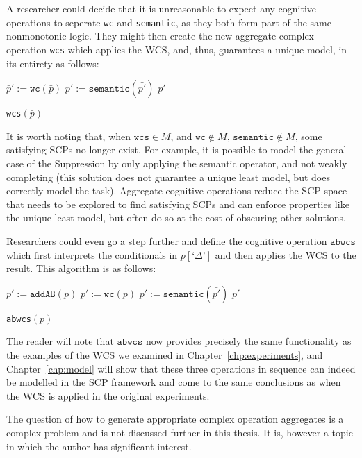 {A researcher could decide that it is unreasonable to expect any cognitive operations to seperate \texttt{wc} and \texttt{semantic}, as they both form part of the same nonmonotonic logic. They might then create the new aggregate complex operation \texttt{wcs} which applies the WCS, and, thus, guarantees a unique model, in its entirety as follows:

\begin{algorithm}[H] 
\SetAlgoLined
{}
{
$\bar{p}':=\texttt{wc}(\bar{p})$\;
$p':=\texttt{semantic}(\bar{p'})$\;
\Return $p'$
}

\caption{\texttt{wcs}$(\bar{p})$}
\label{cogOp:wcs}
\end{algorithm}

It is worth noting that, when $\texttt{wcs} \in M$, and $\texttt{wc} \not\in M$, $\texttt{semantic}\not\in M$, some satisfying SCPs no longer exist. For example, it is possible to model the general case of the Suppression by only applying the semantic operator, and not weakly completing (this solution does not guarantee a unique least model, but does correctly model the task). Aggregate cognitive operations reduce the SCP space that needs to be explored to find satisfying SCPs and can enforce properties like the unique least model, but often do so at the cost of obscuring other solutions.

Researchers could even go a step further and define the cognitive operation $\texttt{abwcs}$ which first interprets the conditionals in $p[\textrm{`}\Delta\textrm{'}]$ and then applies the WCS to the result. This algorithm is as follows:

\begin{algorithm}[H] 
\SetAlgoLined
{}
{
$\bar{p}':=\texttt{addAB}(\bar{p})$\;
$\bar{p}':=\texttt{wc}(\bar{p})$\;
$p':=\texttt{semantic}(\bar{p'})$\;
\Return $p'$
}

\caption{\texttt{abwcs}$(\bar{p})$}
\label{cogOp:abwcs}
\end{algorithm}

The reader will note that $\texttt{abwcs}$ now provides precisely the same functionality as the examples of the WCS we examined in Chapter~\ref{chp:experiments}, and Chapter~\ref{chp:model} will show that these three operations in sequence can indeed be modelled in the SCP framework and come to the same conclusions as when the WCS is applied in the original experiments.

The question of how to generate appropriate complex operation aggregates is a complex problem and is not discussed further in this thesis. It is, however a topic in which the author has significant interest.


}
